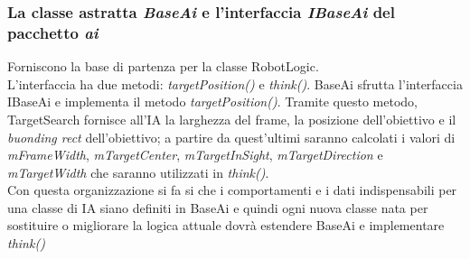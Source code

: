 \subsubsection{La classe astratta \emph{BaseAi} e l'interfaccia \emph{IBaseAi} del pacchetto \emph{ai}}
Forniscono la base di partenza per la classe RobotLogic.\\
L'interfaccia ha due metodi: \emph{targetPosition()} e \emph{think()}.
BaseAi sfrutta l'interfaccia IBaseAi e implementa il metodo \emph{targetPosition()}. 
Tramite questo metodo, TargetSearch fornisce all'IA la larghezza del frame, la posizione 
dell'obiettivo e il \emph{buonding rect} dell'obiettivo; a partire da quest'ultimi saranno 
calcolati i valori di \emph{mFrameWidth}, \emph{mTargetCenter}, \emph{mTargetInSight},
\emph{mTargetDirection} e \emph{mTargetWidth} che saranno utilizzati in \emph{think()}.\\
Con questa organizzazione si fa si che i comportamenti e i dati indispensabili per una classe di 
IA siano definiti in BaseAi e quindi ogni nuova classe nata per sostituire o migliorare
la logica attuale dovrà estendere BaseAi e implementare \emph{think()} 

